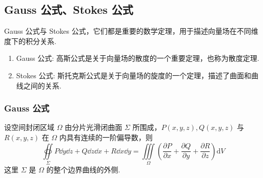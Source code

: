 % 
%     

\subsection{Gauss 公式、Stokes 公式}

Gauss 公式与 Stokes 公式，它们都是重要的数学定理，用于描述向量场在不同维度下的积分关系.
\begin{enumerate}
    \item Gauss 公式: 高斯公式是关于向量场的散度的一个重要定理，也称为散度定理.
    \item Stokes 公式: 斯托克斯公式是关于向量场的旋度的一个定理，描述了曲面和曲线之间的关系.
\end{enumerate}

\subsubsection{Gauss 公式}

\begin{theorem}[Gauss 公式]
    设空间封闭区域 $ \Omega $ 由分片光滑闭曲面 $ \Sigma $ 所围成，$  P(x, y, z), Q(x, y, z) $ 与 \\$ R(x, y, z) $ 在 $ \Omega $ 内具有连续的一阶偏导数，则
    $$\oiint\limits_{\Sigma} P \dd  y \dd  z+Q \dd  z \dd  x+R \dd  x \dd  y =\iiint\limits_{\Omega}\left(\frac{\partial P}{\partial x}+\frac{\partial Q}{\partial y}+\frac{\partial R}{\partial z}\right) \mathrm{d} V$$
    这里 $ \Sigma $ 是 $ \Omega $ 的整个边界曲线的外侧.
\end{theorem}

